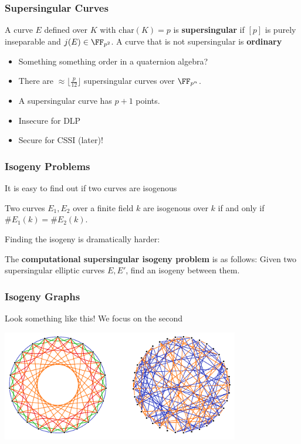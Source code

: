 \documentclass{beamer}
\begin{document}
\begin{frame}
    \frametitle{Supersingular Curves}
    \begin{definition}
        A curve $E$ defined over $K$ with $\mathrm{char}(K) = p$ is \textbf{supersingular}
        if $[p]$ is purely inseparable and $j(E) \in \FF_{p^2}$. 
        A curve that is not supersingular is \textbf{ordinary}
    \end{definition}
    \pause
    \begin{itemize}
        \item<2-> Something something order in a quaternion algebra?
        \item<3-> There are $\approx \lfloor \frac{p}{12} \rfloor$ supersingular curves over $\FF_{p^n}$.
        \item<4-> A supersingular curve has $p + 1$ points.
        \item<5-> Insecure for DLP
        \item<6-> Secure for CSSI (later)!
    \end{itemize}
    

\end{frame}

\begin{frame}
    \frametitle{Isogeny Problems}
    It is easy to find out if two curves are isogenous
    \pause
    \begin{theorem}
        Two curves $E_1, E_2$ over a finite field $k$ are isogenous over $k$ if and only if $\#E_1(k) = \#E_2(k)$.
    \end{theorem}
    \pause
   Finding the isogeny is dramatically harder:
   \pause
   \begin{definition}
       The \textbf{computational supersingular isogeny problem} is as follows:
       Given two supersingular elliptic curves $E, E'$, find an isogeny between them. 
   \end{definition}
\end{frame}

\begin{frame}
    \frametitle{Isogeny Graphs}
    Look something like this! We focus on the second
    \begin{center}
        \includegraphics[width=28em]{isogeny_graph.PNG}
    \end{center}
\end{frame}
\end{document}
